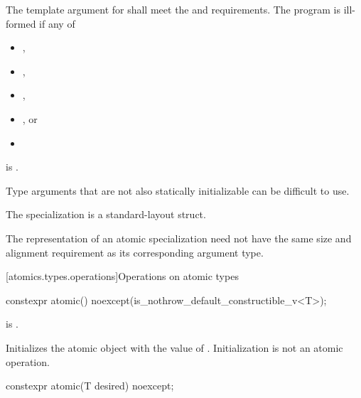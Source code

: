 %
\pnum
The template argument for  shall meet the
 and  requirements.
The program is ill-formed if any of
\begin{itemize}
\item {},
\item {},
\item {},
\item {}, or
\item {}
\end{itemize}
is .
\begin{note}
Type arguments that are
not also statically initializable can be difficult to use.
\end{note}

\pnum
The specialization  is a standard-layout struct.

\pnum
\begin{note}
The representation of an atomic specialization
need not have the same size and alignment requirement as
its corresponding argument type.
\end{note}

[atomics.types.operations]{Operations on atomic types}

%
%
%
%
\begin{itemdecl}
constexpr atomic() noexcept(is_nothrow_default_constructible_v<T>);
\end{itemdecl}

\begin{itemdescr}
\pnum
\mandates
{} is .

\pnum
\effects
Initializes the atomic object with the value of .
Initialization is not an atomic operation.
\end{itemdescr}

%
%
%
%
\begin{itemdecl}
constexpr atomic(T desired) noexcept;
\end{itemdecl}

